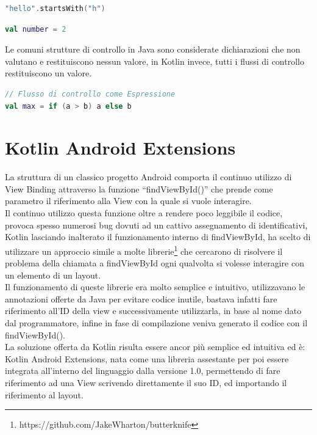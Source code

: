 \begin{lstlisting}[language=kotlin,caption={Espressione - Flussi di Controllo}]
"hello".startsWith("h")
\end{lstlisting}

\begin{lstlisting}[language=kotlin,caption={Dischiarazione - Flussi di Controllo}]
val number = 2
\end{lstlisting}

Le comuni strutture di controllo in Java sono considerate dichiarazioni che non valutano e restituiscono nessun valore, in Kotlin invece, tutti i flussi di controllo restituiscono un valore.

\begin{lstlisting}[language=kotlin,caption={Esempio espresioni in Kotlin}]
// Flusso di controllo come Espressione
val max = if (a > b) a else b
\end{lstlisting}


\section{Kotlin Android Extensions}
La struttura di un classico progetto Android comporta il continuo utilizzo di View Binding attraverso la funzione ``findViewById()'' che prende come parametro il riferimento alla View con la quale si vuole interagire. \\
Il continuo utilizzo questa funzione oltre a rendere poco leggibile il codice, provoca spesso numerosi bug dovuti ad un cattivo assegnamento di identificativi, Kotlin lasciando inalterato il funzionamento interno di findViewById, ha scelto di utilizzare un approccio simile a molte librerie\footnote{https://github.com/JakeWharton/butterknife} che cercarono di risolvere il problema della chiamata a findViewById ogni qualvolta si volesse interagire con un elemento di un layout.\\
Il funzionamento di queste librerie era molto semplice e intuitivo, utilizzavano le annotazioni offerte da Java per evitare codice inutile, bastava infatti fare riferimento all'ID della view e successivamente utilizzarla, in base al nome dato dal programmatore, infine in fase di compilazione veniva generato il codice con il findViewById().\\
La soluzione offerta da Kotlin risulta essere ancor più semplice ed intuitiva ed è: Kotlin Android Extensions, nata come una libreria assestante per poi essere integrata all'interno del linguaggio dalla versione 1.0, permettendo di fare riferimento ad una View scrivendo direttamente il suo ID, ed importando il riferimento al layout.

